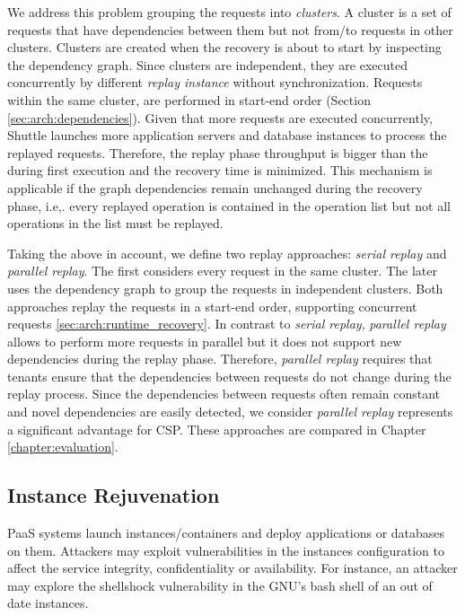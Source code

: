 We address this problem grouping the requests into \emph{clusters}. A cluster is a set of requests that have dependencies between them but not from/to requests in other clusters. Clusters are created when the recovery is about to start by inspecting the dependency graph. Since clusters are independent, they are executed concurrently by different \emph{replay instance} without synchronization. Requests within the same cluster, are performed in start-end order (Section \ref{sec:arch:dependencies}). Given that more requests are executed concurrently, Shuttle launches more application servers and database instances to process the replayed requests. Therefore, the replay phase throughput is bigger than the during first execution and the recovery time is minimized. This mechanism is applicable if the graph dependencies remain unchanged during the recovery phase, i.e,. every replayed operation is contained in the operation list but not all operations in the list must be replayed.

Taking the above in account, we define two replay approaches: \emph{serial replay} and \emph{parallel replay}. The first considers every request in the same cluster. The later uses the dependency graph to group the requests in independent clusters. Both approaches replay the requests in a start-end order, supporting concurrent requests \ref{sec:arch:runtime_recovery}. In contrast to \emph{serial replay}, \emph{parallel replay} allows to perform more requests in parallel but it does not support new dependencies during the replay phase. Therefore, \emph{parallel replay} requires that tenants ensure that the dependencies between requests do not change during the replay process. Since the dependencies between requests often remain constant and novel dependencies are easily detected, we consider \emph{parallel replay} represents a significant advantage for \acf{CSP}. These approaches are compared in Chapter \ref{chapter:evaluation}.




\subsection{Instance Rejuvenation}
\label{sec:arch:image_rejuvenation}

\ac{PaaS} systems launch instances/containers and deploy applications or databases on them. Attackers may exploit vulnerabilities in the instances configuration to affect the service integrity, confidentiality or availability. For instance, an attacker may explore the shellshock vulnerability in the GNU's bash shell of an out of date instances.

